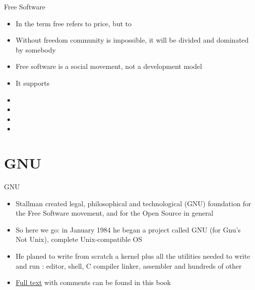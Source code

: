 \documentclass[usenames,dvipsnames,10pt,aspectratio=169]{beamer}
\begin{document}
\begin{frame}{Free Software}
    \begin{itemize}
        \item In the term  free refers to price, but to 
        \item Without freedom community is impossible, it will be divided and dominated by somebody
        \item Free software is a social movement, not a development model
        \item It supports 
        \item {}
        \item {}
        \item {}
        \item {}
    \end{itemize} 
\end{frame}

\section{GNU}

\begin{frame}{GNU}
    \begin{itemize}
        \item Stallman created legal, philosophical and technological (GNU) foundation for the Free Software movement, and for the Open Source in general
        \item So here we go: in January 1984 he began a project called GNU (for Gnu's Not Unix), complete Unix-compatible OS
        \item He planed to write from scratch a kernel plus all the utilities needed to write and run : editor, shell, C compiler linker, assembler and hundreds of other
        \item \href{https://www.oreilly.com/openbook/freedom/ch07.html}{Full text} with comments can be found in this book
    \end{itemize}    
\end{frame}
\end{document}
